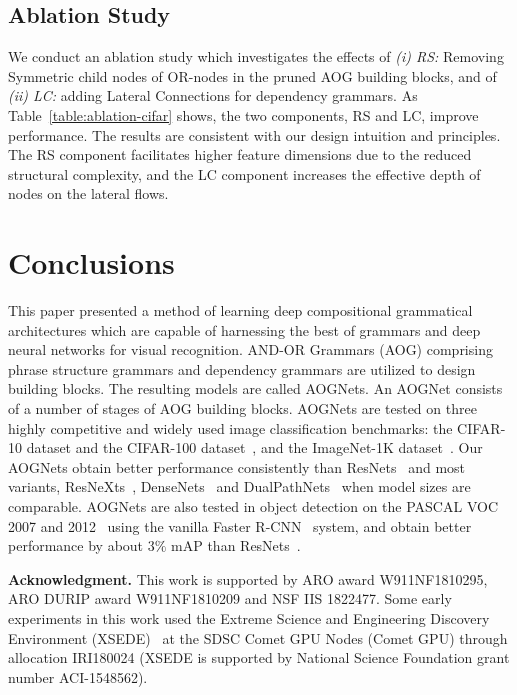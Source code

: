 \documentclass[10pt,twocolumn,letterpaper]{article}
\begin{document}
\subsection{Ablation Study}
We conduct an ablation study which investigates the effects of \emph{(i) RS:} Removing Symmetric child nodes of OR-nodes in the pruned AOG building blocks, and of \emph{(ii) LC:} adding Lateral Connections for dependency grammars. As Table~\ref{table:ablation-cifar} shows, the two components, RS and LC, improve performance. The results are consistent with our design intuition and principles. The RS component facilitates higher feature dimensions due to the reduced structural complexity, and the LC component increases the effective depth of nodes on the lateral flows.   
 
\section{Conclusions} \label{sec:conclusion}
This paper presented a method of learning deep compositional grammatical architectures which are capable of harnessing the best of grammars and deep neural networks for visual recognition. AND-OR Grammars (AOG) comprising phrase structure grammars and dependency grammars are utilized to design building blocks. The resulting models are called AOGNets. An AOGNet consists of a number of stages of AOG building blocks. AOGNets are tested on three highly competitive and widely used image classification  benchmarks: the CIFAR-10 dataset and the CIFAR-100 dataset~\cite{CIFAR},  and the ImageNet-1K dataset~\cite{ImageNet}. Our AOGNets obtain better performance consistently than  ResNets~\cite{ResidualNet} and most variants, ResNeXts~\cite{ResNeXt}, DenseNets~\cite{DenseNet} and DualPathNets~\cite{DPN} when model sizes are comparable. AOGNets are also tested in object detection on the PASCAL VOC 2007 and 2012~\cite{VOC} using the vanilla Faster R-CNN~\cite{FasterRCNN} system, and obtain better performance by about $3\%$ mAP than ResNets~\cite{ResidualNet}.  


\noindent\textbf{Acknowledgment.} This work is supported by ARO award W911NF1810295, ARO DURIP award W911NF1810209 and NSF IIS 1822477. Some early experiments in this work used the Extreme Science and Engineering Discovery Environment (XSEDE)~\cite{XSEDE} at the SDSC Comet GPU Nodes (Comet GPU) through allocation IRI180024 (XSEDE is supported by National Science Foundation grant number ACI-1548562).


{\small


}
\end{document}
